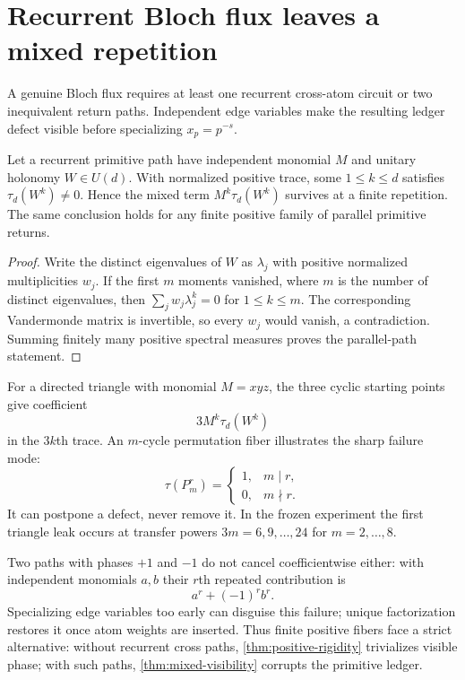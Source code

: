 \section{Recurrent Bloch flux leaves a mixed repetition}
\label{sec:mixed}

A genuine Bloch flux requires at least one recurrent cross-atom circuit or
two inequivalent return paths.  Independent edge variables make the resulting
ledger defect visible before specializing $x_p=p^{-s}$.

\begin{theorem}
\label{thm:mixed-visibility}
Let a recurrent primitive path have independent monomial $M$ and unitary
holonomy $W\in U(d)$.  With normalized positive trace, some
$1\leq k\leq d$ satisfies $\tau_d(W^k)\ne0$.  Hence the mixed term
$M^k\tau_d(W^k)$ survives at a finite repetition.  The same conclusion holds
for any finite positive family of parallel primitive returns.
\end{theorem}

\begin{proof}
Write the distinct eigenvalues of $W$ as $\lambda_j$ with positive normalized
multiplicities $w_j$.  If the first $m$ moments vanished, where $m$ is the
number of distinct eigenvalues, then
\(
 \sum_j w_j\lambda_j^k=0
\)
for $1\leq k\leq m$.  The corresponding Vandermonde matrix is invertible,
so every $w_j$ would vanish, a contradiction.  Summing finitely many positive
spectral measures proves the parallel-path statement.
\end{proof}

For a directed triangle with monomial $M=xyz$, the three cyclic starting
points give coefficient
\[
 3M^k\tau_d(W^k)                                           \tag{5.1}
\]
in the $3k$th trace.  An $m$-cycle permutation fiber illustrates the sharp
failure mode:
\[
 \tau(P_m^r)=\begin{cases}1,&m\mid r,\\0,&m\nmid r.
 \end{cases}                                                \tag{5.2}\label{eq:cycle-moment}
\]
It can postpone a defect, never remove it.  In the frozen experiment the
first triangle leak occurs at transfer powers $3m=6,9,\ldots,24$ for
$m=2,\ldots,8$.

Two paths with phases $+1$ and $-1$ do not cancel coefficientwise either:
with independent monomials $a,b$ their $r$th repeated contribution is
\[
 a^r+(-1)^rb^r.                                             \tag{5.3}
\]
Specializing edge variables too early can disguise this failure; unique
factorization restores it once atom weights are inserted.  Thus finite
positive fibers face a strict alternative: without recurrent cross paths,
\cref{thm:positive-rigidity} trivializes visible phase; with such paths,
\cref{thm:mixed-visibility} corrupts the primitive ledger.
